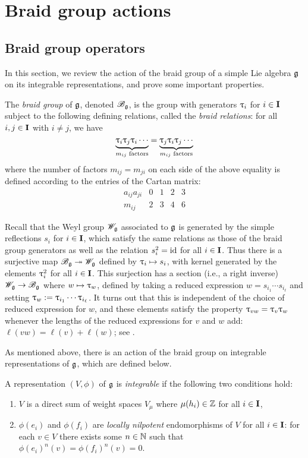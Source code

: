\chapter{Braid group actions}

\section{Braid group operators}

In this section, we review the action of the braid group of a simple Lie algebra $\mathfrak{g}$ on its integrable representations, and prove some important properties.

The \emph{braid group} of $\mathfrak{g}$, denoted $\mathscr{B}_{\mathfrak{g}}$, is the group with generators $\uptau_i$ for $i\in\mathbf{I}$ subject to the following defining relations, called the \emph{braid relations}: for all $i,j\in\mathbf{I}$ with $i\neq j$, we have
\[\underbrace{\uptau_i\uptau_j\uptau_i\cdots}_{m_{ij}\text{ factors}} = \underbrace{\uptau_j\uptau_i\uptau_j\cdots}_{m_{ij}\text{ factors}}\]
where the number of factors $m_{ij}=m_{ji}$ on each side of the above equality is defined according to the entries of the Cartan matrix:
\[\begin{array}{c|cccc}
    a_{ij}a_{ji} & 0 & 1 & 2 & 3 \\
    \hline
    m_{ij} & 2 & 3 & 4 & 6
\end{array}\]

Recall that the Weyl group $\mathscr{W}_{\mathfrak{g}}$ associated to $\mathfrak{g}$ is generated by the simple reflections $s_i$ for $i\in\mathbf{I}$, which satisfy the same relations as those of the braid group generators as well as the relation $s_i^2={\operatorname{id}}$ for all $i\in\mathbf{I}$.
Thus there is a surjective map $\mathscr{B}_{\mathfrak{g}}\twoheadrightarrow\mathscr{W}_{\mathfrak{g}}$ defined by $\uptau_i\mapsto s_i$, with kernel generated by the elements $\uptau_i^2$ for all $i\in\mathbf{I}$.
This surjection has a section (i.e., a right inverse) $\mathscr{W}_{\mathfrak{g}}\to\mathscr{B}_{\mathfrak{g}}$ where $w\mapsto\uptau_w$, defined by taking a reduced expression $w=s_{i_1}\cdots s_{i_\ell}$ and setting $\uptau_w:=\uptau_{i_1}\cdots\uptau_{i_\ell}$.
It turns out that this is independent of the choice of reduced expression for $w$, and these elements satisfy the property $\uptau_{vw}=\uptau_v\uptau_w$ whenever the lengths of the reduced expressions for $v$ and $w$ add: $\ell(vw)=\ell(v)+\ell(w)$; see \cite[\S2.1.2]{lusztig_introduction_2010}.

As mentioned above, there is an action of the braid group on integrable representations of $\mathfrak{g}$, which are defined below.

\begin{definition}\label{D:integrable}
    A representation $(V,\phi)$ of $\mathfrak{g}$ is \emph{integrable} if the following two conditions hold:
    \begin{enumerate}
        \item $V$ is a direct sum of weight spaces $V_\mu$ where $\mu(h_i)\in\mathbb{Z}$ for all $i\in\mathbf{I}$,
        \item $\phi(e_i)$ and $\phi(f_i)$ are \emph{locally nilpotent} endomorphisms of $V$ for all $i\in\mathbf{I}$: for each $v\in V$ there exists some $n\in\mathbb{N}$ such that $\phi(e_i)^n(v)=\phi(f_i)^n(v)=0$.
    \end{enumerate}
\end{definition}

